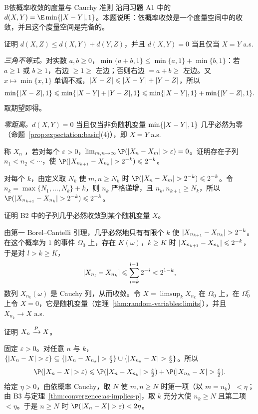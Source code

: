 \begin{probleme}{B}{依概率收敛的度量与 Cauchy 准则}
沿用习题 A1 中的 $d(X,Y)=\E\min\{\abs{X-Y},1\}$。本题说明：依概率收敛是一个度量空间中的收敛，并且这个度量空间是完备的。
\begin{questions}
\item 证明 $d(X,Z)\leqslant d(X,Y)+d(Y,Z)$，并且 $d(X,Y)=0$ 当且仅当 $X=Y$ a.s.
\begin{solution}
\emph{三角不等式。}对实数 $a,b\geqslant0$，$\min\{a+b,1\}\leqslant\min\{a,1\}+\min\{b,1\}$：若 $a\geqslant1$ 或 $b\geqslant1$，右边 $\geqslant1\geqslant$ 左边；否则右边 $=a+b\geqslant$ 左边。又 $x\mapsto\min\{x,1\}$ 单调不减，$\lvert X-Z\rvert\leqslant\lvert X-Y\rvert+\lvert Y-Z\rvert$，所以
\[
\min\{\lvert X-Z\rvert,1\}\leqslant\min\{\lvert X-Y\rvert+\lvert Y-Z\rvert,1\}\leqslant\min\{\lvert X-Y\rvert,1\}+\min\{\lvert Y-Z\rvert,1\}.
\]
取期望即得。

\emph{零距离。}$d(X,Y)=0$ 当且仅当非负随机变量 $\min\{\lvert X-Y\rvert,1\}$ 几乎必然为零（命题~\ref{prop:expectation:basic}(4)），即 $X=Y$ a.s.
\end{solution}

\item 称 $X_n$ ，若对每个 $\varepsilon>0$，$\lim_{m,n\to\infty}\P(\abs{X_n-X_m}>\varepsilon)=0$。证明存在子列 $n_1<n_2<\cdots$，使 $\P(\abs{X_{n_{k+1}}-X_{n_k}}>2^{-k})\leqslant2^{-k}$。
\begin{solution}
对每个 $k$，由定义取 $N_k$ 使 $m,n\geqslant N_k$ 时 $\P(\abs{X_n-X_m}>2^{-k})\leqslant2^{-k}$。令 $n_k=\max\{N_1,\dots,N_k\}+k$，则 $n_k$ 严格递增，且 $n_k,n_{k+1}\geqslant N_k$，所以 $\P(\abs{X_{n_{k+1}}-X_{n_k}}>2^{-k})\leqslant2^{-k}$。
\end{solution}

\item 证明 B2 中的子列几乎必然收敛到某个随机变量 $X$。
\begin{solution}
由第一 Borel--Cantelli 引理，几乎必然地只有有限个 $k$ 使 $\lvert X_{n_{k+1}}-X_{n_k}\rvert>2^{-k}$。在这个概率为 $1$ 的事件 $\Omega_0$ 上，存在 $K(\omega)$，$k\geqslant K$ 时 $\lvert X_{n_{k+1}}-X_{n_k}\rvert\leqslant2^{-k}$，于是对 $l>k\geqslant K$，
\[
\lvert X_{n_l}-X_{n_k}\rvert\leqslant\sum_{i=k}^{l-1}2^{-i}<2^{1-k},
\]
数列 $X_{n_k}(\omega)$ 是 Cauchy 列，从而收敛。令 $X=\limsup_kX_{n_k}$ 在 $\Omega_0$ 上，在 $\Omega_0^c$ 上令 $X=0$，它是随机变量（定理~\ref{thm:random-variables:limits}），并且 $X_{n_k}\to X$ a.s.
\end{solution}

\item 证明 $X_n\xrightarrow{P} X$。
\begin{solution}
固定 $\varepsilon>0$。对任意 $n$ 与 $k$，$\{\lvert X_n-X\rvert>\varepsilon\}\subseteq\{\lvert X_n-X_{n_k}\rvert>\frac\varepsilon2\}\cup\{\lvert X_{n_k}-X\rvert>\frac\varepsilon2\}$。所以
\[
\P(\abs{X_n-X}>\varepsilon)\leqslant \P(\abs{X_n-X_{n_k}}>\tfrac\varepsilon2)+\P(\abs{X_{n_k}-X}>\tfrac\varepsilon2).
\]
给定 $\eta>0$，由依概率 Cauchy，取 $N$ 使 $m,n\geqslant N$ 时第一项（以 $m=n_k$）$<\eta$；由 B3 与定理~\ref{thm:convergence:as-implies-p}，取 $k$ 充分大使 $n_k\geqslant N$ 且第二项 $<\eta$。于是 $n\geqslant N$ 时 $\P(\abs{X_n-X}>\varepsilon)<2\eta$。


\end{solution}
\end{questions}
\end{probleme}
